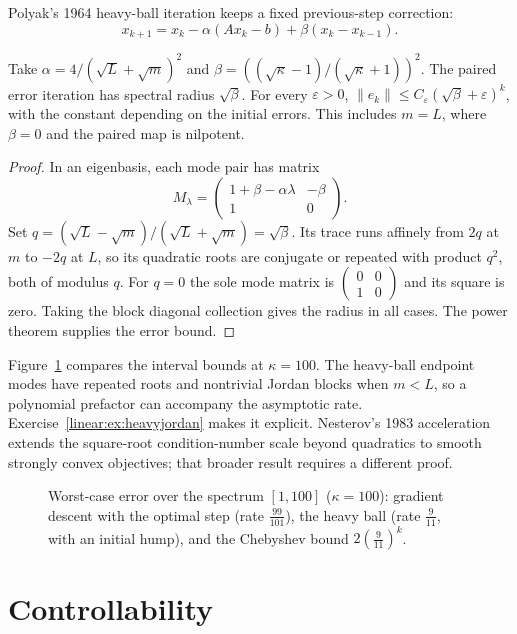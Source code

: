 Polyak's 1964 heavy-ball iteration keeps a fixed previous-step correction:
\[x_{k+1}=x_k-\alpha(Ax_k-b)+\beta(x_k-x_{k-1}).\]
\begin{theorem}\label{linear:thm:heavyball}
Take $\alpha=4/(\sqrt L+\sqrt m)^2$ and $\beta=((\sqrt\kappa-1)/(\sqrt\kappa+1))^2$. The paired error iteration has spectral radius $\sqrt\beta$. For every $\varepsilon>0$, $\|e_k\|\le C_\varepsilon(\sqrt\beta+\varepsilon)^k$, with the constant depending on the initial errors. This includes $m=L$, where $\beta=0$ and the paired map is nilpotent.
\end{theorem}
\begin{proof}
In an eigenbasis, each mode pair has matrix
\[M_\lambda=\begin{pmatrix}1+\beta-\alpha\lambda&-\beta\\1&0\end{pmatrix}.
\]
Set $q=(\sqrt L-\sqrt m)/(\sqrt L+\sqrt m)=\sqrt\beta$. Its trace runs affinely from $2q$ at $m$ to $-2q$ at $L$, so its quadratic roots are conjugate or repeated with product $q^2$, both of modulus $q$. For $q=0$ the sole mode matrix is $\begin{pmatrix}0&0\\1&0\end{pmatrix}$ and its square is zero. Taking the block diagonal collection gives the radius in all cases. The power theorem supplies the error bound.
\end{proof}

Figure~\ref{linear:fig:rates} compares the interval bounds at $\kappa=100$. The heavy-ball endpoint modes have repeated roots and nontrivial Jordan blocks when $m<L$, so a polynomial prefactor can accompany the asymptotic rate. Exercise~\ref{linear:ex:heavyjordan} makes it explicit. Nesterov's 1983 acceleration extends the square-root condition-number scale beyond quadratics to smooth strongly convex objectives; that broader result requires a different proof.

\begin{figure}[ht]
\centering
{}
\caption{Worst-case error over the spectrum $[1,100]$ ($\kappa=100$): gradient descent with the optimal step (rate $\frac{99}{101}$), the
heavy ball (rate $\frac9{11}$, with an initial hump), and the Chebyshev bound $2(\frac9{11})^k$.}
\label{linear:fig:rates}
\end{figure}

\section{Controllability}

